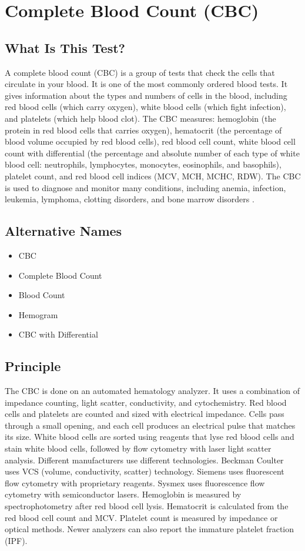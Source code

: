 \chapter{Complete Blood Count (CBC)}

\section*{What Is This Test?}
A complete blood count (CBC) is a group of tests that check the cells that circulate in your blood. It is one of the most commonly ordered blood tests. It gives information about the types and numbers of cells in the blood, including red blood cells (which carry oxygen), white blood cells (which fight infection), and platelets (which help blood clot). The CBC measures: hemoglobin (the protein in red blood cells that carries oxygen), hematocrit (the percentage of blood volume occupied by red blood cells), red blood cell count, white blood cell count with differential (the percentage and absolute number of each type of white blood cell: neutrophils, lymphocytes, monocytes, eosinophils, and basophils), platelet count, and red blood cell indices (MCV, MCH, MCHC, RDW). The CBC is used to diagnose and monitor many conditions, including anemia, infection, leukemia, lymphoma, clotting disorders, and bone marrow disorders \cite{wallach2022interpretation}.

\section*{Alternative Names}
\begin{itemize}
  \item CBC
  \item Complete Blood Count
  \item Blood Count
  \item Hemogram
  \item CBC with Differential
\end{itemize}
\section*{Principle}
The CBC is done on an automated hematology analyzer. It uses a combination of impedance counting, light scatter, conductivity, and cytochemistry. Red blood cells and platelets are counted and sized with electrical impedance. Cells pass through a small opening, and each cell produces an electrical pulse that matches its size. White blood cells are sorted using reagents that lyse red blood cells and stain white blood cells, followed by flow cytometry with laser light scatter analysis. Different manufacturers use different technologies. Beckman Coulter uses VCS (volume, conductivity, scatter) technology. Siemens uses fluorescent flow cytometry with proprietary reagents. Sysmex uses fluorescence flow cytometry with semiconductor lasers. Hemoglobin is measured by spectrophotometry after red blood cell lysis. Hematocrit is calculated from the red blood cell count and MCV. Platelet count is measured by impedance or optical methods. Newer analyzers can also report the immature platelet fraction (IPF).

